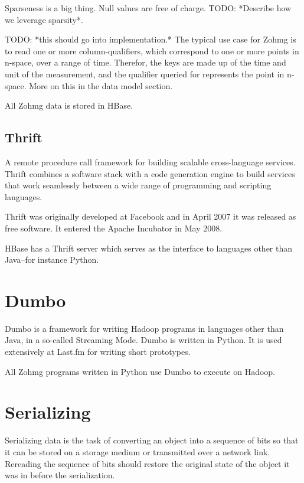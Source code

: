 \documentclass[a4paper,10pt]{book}
\begin{document}
Sparseness is a big thing. Null values are free of charge. TODO: *Describe
how we leverage sparsity*.

TODO: *this should go into implementation.*
The typical use case for Zohmg is to read one or more column-qualifiers,
which correspond to one or more points in n-space, over a range of time.
Therefor, the keys are made up of the time and unit of the measurement,
and the qualifier queried for represents the point in n-space. More on
this in the data model section.

All Zohmg data is stored in HBase.


\subsection{Thrift}

A remote procedure call framework for building scalable cross-language
services. Thrift combines a software stack with a code generation engine to
build services that work seamlessly between a wide range of programming and
scripting languages. \cite{thrift}

Thrift was originally developed at Facebook and in April 2007 it was
released as free software. It entered the Apache Incubator in May 2008.

HBase has a Thrift server which serves as the interface to languages other
than Java--for instance Python.



\section{Dumbo}

Dumbo is a framework for writing Hadoop programs in languages other than
Java, in a so-called Streaming Mode. Dumbo is written in Python. It is used
extensively at Last.fm for writing short prototypes. \cite{dumbo}

All Zohmg programs written in Python use Dumbo to execute on Hadoop.


\section{Serializing}

Serializing data is the task of converting an object into a sequence of
bits so that it can be stored on a storage medium or transmitted over a
network link. Rereading the sequence of bits should restore the original
state of the object it was in before the serialization.
\end{document}
